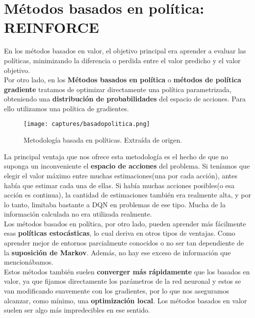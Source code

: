 \documentclass[11pt,fleqn]{book} %
\begin{document}
\section{Métodos basados en política: REINFORCE}

En los métodos basados en valor, el objetivo principal era aprender a evaluar las políticas, minimizando la diferencia o perdida entre el valor predicho y el valor objetivo. \\

Por otro lado, en los \textbf{Métodos basados en política} o \textbf{métodos de política gradiente} tratamos de optimizar directamente una política parametrizada, obteniendo una \textbf{distribución de probabilidades} del espacio de acciones. Para ello utilizamos una política de gradientes. \\

\begin{figure}[H]
	\centering\texttt{[image: captures/basadopolitica.png]}
	\caption{Metodología basada en políticas. Extraída de origen. \cite{article:RLromero}}
	\label{fig:reinforce} %
\end{figure}

La principal ventaja que nos ofrece esta metodología es el hecho de que no suponga un inconveniente el \textbf{espacio de acciones} del problema. Si teníamos que elegir el valor máximo entre muchas estimaciones(una por cada acción), antes había que estimar cada una de ellas. Si había muchas acciones posibles(o esa acción es continua), la cantidad de estimaciones también era realmente alta, y por lo tanto, limitaba bastante a DQN en problemas de ese tipo. Mucha de la información calculada no era utilizada realmente. \\

Los métodos basados en política, por otro lado, pueden aprender más fácilmente esas \textbf{políticas estocásticas}, lo cual deriva en otros tipos de ventajas. Como aprender mejor de entornos parcialmente conocidos o no ser tan dependiente de la \textbf{suposición de Markov}. Además, no hay ese exceso de información que mencionábamos. \\

Estos métodos también suelen \textbf{converger más rápidamente} que los basados en valor, ya que fijamos directamente los parámetros de la red neuronal y estos se van modificando suavemente con los gradientes, por lo que nos aseguramos alcanzar, como mínimo, una \textbf{optimización local}. Los métodos basados en valor suelen ser algo más impredecibles en ese sentido.\\
\end{document}
